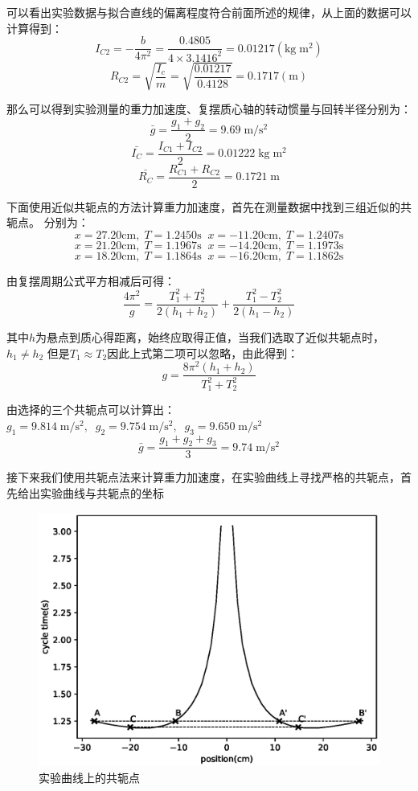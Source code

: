 \documentclass[a4paper]{ctexart}
\def\cm{\mathrm{cm}}
\def\s{\mathrm{s}}
\begin{document}
    \par 
    可以看出实验数据与拟合直线的偏离程度符合前面所述的规律，从上面的数据可以计算得到：
    $$
    I_{C2} = -\frac{b}{4\pi^{2}} = \frac{0.4805}{4\times 3.1416^{2}} = 0.01217(\mathrm{kg\;m^{2}})
    $$
    $$
    R_{C2} = \sqrt{\frac{I_{c}}{m}} = \sqrt{\frac{0.01217}{0.4128}} = 0.1717(\mathrm{m})
    $$
    \par 
    那么可以得到实验测量的重力加速度、复摆质心轴的转动惯量与回转半径分别为：
    $$
    \bar{g} = \frac{g_{1}+g_{2}}{2} = 9.69\;\mathrm{m/s^{2}}
    $$
    $$
    \bar{I_{C}} = \frac{I_{C1} + I_{C2}}{2} = 0.01222\;\mathrm{kg\;m^{2}}
    $$
    $$
    \bar{R_{C}} = \frac{R_{C1} + R_{C2}}{2} = 0.1721\;\mathrm{m}
    $$
    \par 
    下面使用近似共轭点的方法计算重力加速度，首先在测量数据中找到三组近似的共轭点。
    分别为：
    $$x = 27.20\cm,\;T = 1.2450\s\;\;x = -11.20\cm,\; T = 1.2407\s$$
    $$x = 21.20\cm,\;T = 1.1967\s\;\;x = -14.20\cm,\; T = 1.1973\s$$
    $$x = 18.20\cm,\;T = 1.1864\s\;\;x = -16.20\cm,\; T = 1.1862\s$$
    \par 
    由复摆周期公式平方相减后可得：
    $$
    \frac{4\pi^{2}}{g} = \frac{T_{1}^{2} +T_{2}^{2}}{2(h_{1} + h_{2})} + \frac{T_{1}^{2} - T_{2}^{2}}{2(h_{1}-h_{2})}
    $$
    \par 
    其中$h$为悬点到质心得距离，始终应取得正值，当我们选取了近似共轭点时，$h_{1} \neq h_{2}$
    但是$T_{1} \approx T_{2}$因此上式第二项可以忽略，由此得到：
    $$g = \frac{8\pi^{2}(h_{1} + h_{2})}{T_{1}^{2} + T_{2}^{2}}$$
    \par 
    由选择的三个共轭点可以计算出：$g_{1} = 9.814\;\mathrm{m/s^{2}},\;\;g_{2} = 9.754\;\mathrm{m/s^{2}},\;\;g_{3} = 9.650\;\mathrm{m/s^{2}}$
    $$\bar{g} = \frac{g_{1} + g_{2} + g_{3}}{3} = 9.74\;\mathrm{m/s^{2}}$$
    \par 
    接下来我们使用共轭点法来计算重力加速度，在实验曲线上寻找严格的共轭点，首先给出实验曲线与共轭点的坐标
    \begin{figure}[htbp]
        \centering
        \includegraphics[scale=0.7]{conjugate_point.eps}
        \caption{实验曲线上的共轭点}
    \end{figure}
\end{document}
